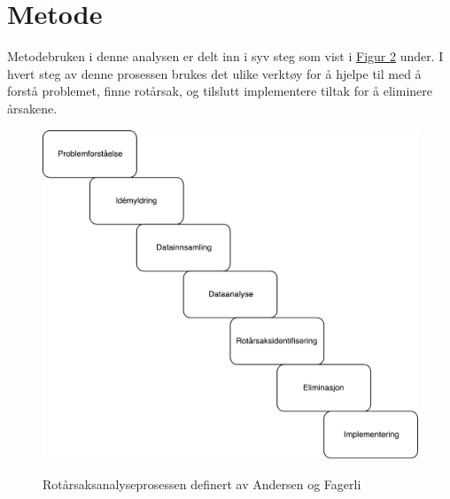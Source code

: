 \section{Metode}

Metodebruken i denne analysen er delt inn i syv steg som vist i \hyperref[fig:prosess]{Figur 2} under. I hvert steg av denne prosessen brukes det ulike verktøy for å hjelpe til med å forstå problemet, finne rotårsak, og tilslutt implementere tiltak for å eliminere årsakene. 
\begin{figure}[H]
    \centering
    \includegraphics[scale=0.6]{case_1/bilder/prosess.pdf}
    \label{fig:prosess}
    \caption[Rotårsaksanalyseprosessen]{Rotårsaksanalyseprosessen definert av Andersen og Fagerli}
\end{figure}